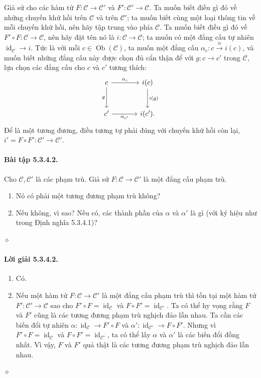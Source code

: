 Giả sử cho các hàm tử $F:\mathcal C\to\mathcal C'$ và $F':\mathcal C'\to\mathcal C$. Ta muốn biết điều gì đó về những chuyến khứ hồi trên $\mathcal C$ và trên $\mathcal C'$; ta muốn biết cùng một loại thông tin về mỗi chuyến khứ hồi, nên hãy tập trung vào phía $\mathcal C$. Ta muốn biết điều gì đó về $F'\circ F:\mathcal C\to\mathcal C$, nên hãy đặt tên nó là $i:\mathcal C\to\mathcal C$; ta muốn có một đẳng cấu tự nhiên $\operatorname{id}_{\mathcal C}\to i$. Tức là với mỗi $c\in\operatorname{Ob}(\mathcal C)$, ta muốn một đẳng cấu $\alpha_c:c\xrightarrow{\cong}i(c)$, và muốn biết những đẳng cấu này được chọn đủ cẩn thận để với $g:c\to c'$
trong $\mathcal C$, lựa chọn các đẳng cấu cho $c$ và $c'$ tương thích:
\[\begin{tikzcd}[column sep=large,row sep=large]c\arrow[r,"\alpha_c"]\arrow[d,"g"']&i(c)\arrow[d,"i(g)"]\\c'\arrow[r,"\alpha_{c'}"']&i(c').\end{tikzcd}\]
Để là một tương đương, điều tương tự phải đúng với chuyến khứ hồi còn lại, $i'=F\circ F':\mathcal C'\to\mathcal C'$.
\paragraph{Bài tập 5.3.4.2.} Cho $\mathcal C,\mathcal C'$ là các phạm trù. Giả sử $F:\mathcal C\to\mathcal C'$ là một đẳng cấu phạm trù.
\begin{enumerate}[label=\alph*.]\item Nó có phải một tương đương phạm trù không?\item Nếu không, vì sao? Nếu có, các thành phần của $\alpha$ và $\alpha'$ là gì (với ký hiệu như trong Định nghĩa 5.3.4.1)?\end{enumerate}\hfill$\diamond$
\paragraph{Lời giải 5.3.4.2.}
\begin{enumerate}[label=\alph*.]
\item Có.
\item Nếu một hàm tử $F:\mathcal C\to\mathcal C'$ là một đẳng cấu phạm trù thì tồn tại một hàm tử $F':\mathcal C'\to\mathcal C$ sao cho $F'\circ F=\operatorname{id}_{\mathcal C}$ và $F\circ F'=\operatorname{id}_{\mathcal C'}$. Ta có thể hy vọng rằng $F$ và $F'$ cũng là các tương đương phạm trù nghịch đảo lẫn nhau. Ta cần các biến đổi tự nhiên $\alpha:\operatorname{id}_{\mathcal C}\to F'\circ F$ và $\alpha':\operatorname{id}_{\mathcal C'}\to F\circ F'$. Nhưng vì $F'\circ F=\operatorname{id}_{\mathcal C}$ và $F\circ F'=\operatorname{id}_{\mathcal C'}$, ta có thể lấy $\alpha$ và $\alpha'$ là các biến đổi đồng nhất. Vì vậy, $F$ và $F'$ quả thật là các tương đương phạm trù nghịch đảo lẫn nhau.
\end{enumerate}\hfill$\diamond$
